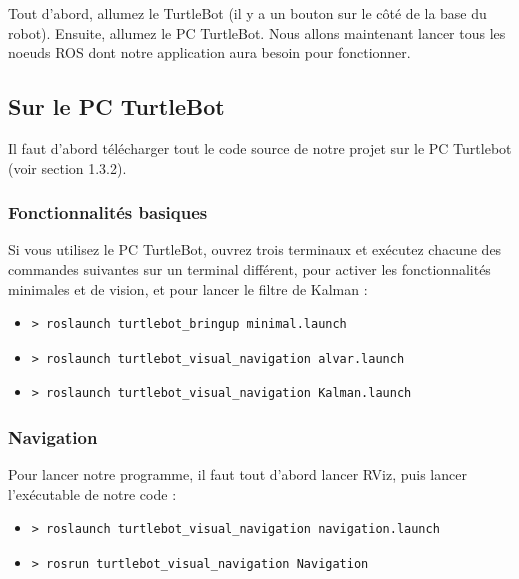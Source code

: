 \documentclass[10pt,a4paper]{article}
\begin{document}
Tout d'abord, allumez le TurtleBot (il y a un bouton sur le côté de la base du robot). Ensuite, allumez le PC TurtleBot. Nous allons maintenant lancer tous les noeuds ROS dont notre application aura besoin pour fonctionner.

\subsection{Sur le PC TurtleBot}

Il faut d'abord télécharger tout le code source de notre projet sur le PC Turtlebot (voir section 1.3.2).

\subsubsection{Fonctionnalités basiques}
\label{sec:navigation2}

Si vous utilisez le PC TurtleBot, ouvrez trois terminaux et exécutez chacune des commandes suivantes sur un terminal différent, pour activer les fonctionnalités minimales et de vision, et pour lancer le filtre de Kalman :

\begin{itemize}
\item[]  \begin{verbatim}> roslaunch turtlebot_bringup minimal.launch \end{verbatim}
\item[]  \begin{verbatim}> roslaunch turtlebot_visual_navigation alvar.launch \end{verbatim}
\item[]  \begin{verbatim}> roslaunch turtlebot_visual_navigation Kalman.launch \end{verbatim}
\end{itemize}

\subsubsection{Navigation}
\label{sec:navigation}

Pour lancer notre programme, il faut tout d'abord lancer RViz, puis lancer l'exécutable de notre code :

\begin{itemize}
\item[] \begin{verbatim}> roslaunch turtlebot_visual_navigation navigation.launch \end{verbatim}
\item[]  \begin{verbatim}> rosrun turtlebot_visual_navigation Navigation \end{verbatim}
\end{itemize}
\end{document}
